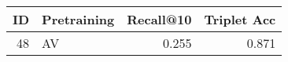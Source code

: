 \begin{tabular}{rlrr}
\toprule
 ID & Pretraining &  Recall@10 &  Triplet Acc \\
\midrule
 48 &          AV &      0.255 &        0.871 \\
\bottomrule
\end{tabular}
